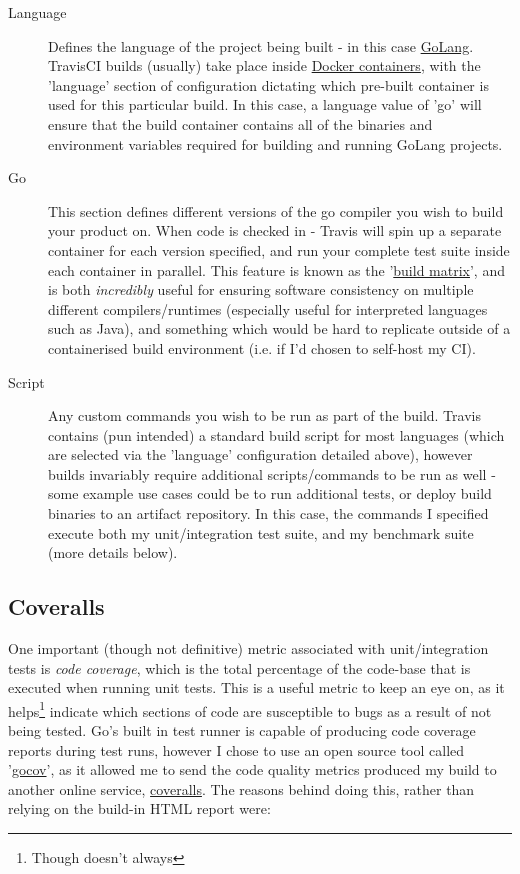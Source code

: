 \begin{description}
  \item[Language] Defines the language of the project being built - in this case
  \href{https://golang.org/}{GoLang}. TravisCI builds (usually) take place
  inside \href{https://www.docker.com/what-docker}{Docker containers}, with the
  'language' section of configuration dictating which pre-built container is
  used for this particular build. In this case, a language value of 'go' will
  ensure that the build container contains all of the binaries and environment
  variables required for building and running GoLang projects.
  \item[Go] This section defines different versions of the go compiler you wish
  to build your product on. When code is checked in - Travis will spin up a
  separate container for each version specified, and run your complete test
  suite inside each container in parallel. This feature is known as the
  '\href{https://docs.travis-ci.com/user/customizing-the-build/#Build-Matrix}{build
  matrix}', and is both \emph{incredibly} useful for ensuring software
  consistency on multiple different compilers/runtimes (especially useful for
  interpreted languages such as Java), and something which would be hard to
  replicate outside of a containerised build environment (i.e. if I'd chosen to
  self-host my CI).
  \item[Script] Any custom commands you wish to be run as part of the build.
  Travis contains (pun intended) a standard build script for most languages
  (which are selected via the 'language' configuration detailed above), however
  builds invariably require additional scripts/commands to be run as well - some
  example use cases could be to run additional tests, or deploy build binaries
  to an artifact repository. In this case, the commands I specified execute both
  my unit/integration test suite, and my benchmark suite (more details below).
\end{description}

\subsection{Coveralls}
\label{sub:Coveralls}


One important (though not definitive) metric associated with unit/integration
tests is \emph{code coverage}, which is the total percentage of the code-base
that is executed when running unit tests. This is a useful metric to keep an eye
on, as it helps\footnote{Though doesn't always} indicate which sections of code
are susceptible to bugs as a result of not being tested. Go's built in test
runner is capable of producing code coverage reports during test runs, however I
chose to use an open source tool called
'\href{https://github.com/axw/gocov}{gocov}', as it allowed me to send the code
quality metrics produced my build to another online service,
\href{https://coveralls.io/}{coveralls}. The reasons behind doing this, rather
than relying on the build-in HTML report were:

